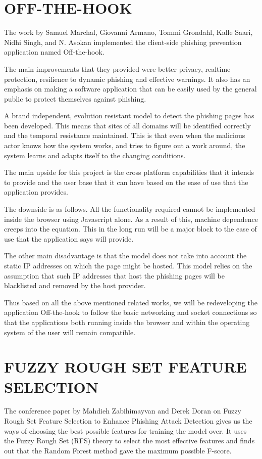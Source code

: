 \section{OFF-THE-HOOK}
The work \cite{marchal} by Samuel Marchal, Giovanni Armano, Tommi Grondahl, Kalle Saari, Nidhi Singh, and N. Asokan implemented the client-side phishing prevention application named Off-the-hook.

The main improvements that they provided were better privacy, realtime protection, resilience to dynamic phishing and effective warnings. It also has an emphasis on making a software application that can be easily used by the general public to protect themselves against phishing.

A brand independent, evolution resistant model to detect the phishing pages has been developed. This means that sites of all domains will be identified correctly and the temporal resistance maintained. This is that even when the malicious actor knows how the system works, and tries to figure out a work around, the system learns and adapts itself to the changing conditions.

The main upside for this project is the cross platform capabilities that it intends to provide and the user base that it can have based on the ease of use that the application provides.

The downside is as follows. All the functionality required cannot be implemented inside the browser using Javascript alone. As a result of this, machine dependence creeps into the equation. This in the long run will be a major block to the ease of use that the application says will provide.

The other main disadvantage is that the model does not take into account the static IP addresses on which the page might be hosted. This model relies on the assumption that such IP addresses that host the phishing pages will be blacklisted and removed by the host provider.

Thus based on all the above mentioned related works, we will be redeveloping the application Off-the-hook to follow the basic networking and socket connections so that the applications both running inside the browser and within the operating system of the user will remain compatible.

\section{FUZZY ROUGH SET FEATURE SELECTION}
The conference paper \cite{zabihimayvan} by Mahdieh Zabihimayvan and Derek Doran on Fuzzy Rough Set Feature Selection to Enhance Phishing Attack Detection gives us the ways of choosing the best possible features for training the model over. It uses the Fuzzy Rough Set (RFS) theory to select the most effective features and finds out that the Random Forest method gave the maximum possible F-score.

